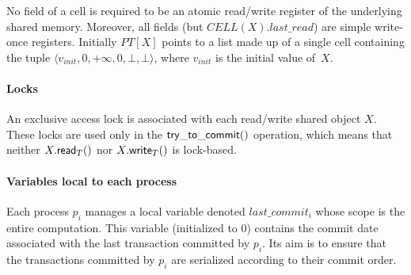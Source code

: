 \begin{figure}[htb!]
\end{figure}


No field of a cell is required to be an atomic read/write register of 
the underlying  shared memory. Moreover, all fields (but  
$CELL(X).last\_read$)  are simple write-once registers. 
%
Initially $PT[X]$ points to a list made up of a  single cell 
containing the  tuple $\langle v_{init},0,+\infty,0,\bot,\bot\rangle$,  
where $v_{init}$ is the initial value of~$X$. 



\paragraph{Locks}
An exclusive access lock is associated with each read/write shared object 
$X$. These locks are used only in the ${\sf try\_to\_commit}()$ operation,
which means that neither $X.{\sf read}_T()$ nor $X.{\sf write}_T()$ 
is lock-based. 


\paragraph{Variables  local to each process}
Each process $p_i$ manages a local variable  denoted $last\_commit_i$ 
whose scope is the entire computation. This variable 
(initialized to $0$)  contains the commit date associated with the last 
transaction committed by $p_i$. Its aim is to ensure that the transactions 
committed by $p_i$  are serialized according to  their commit order. 


